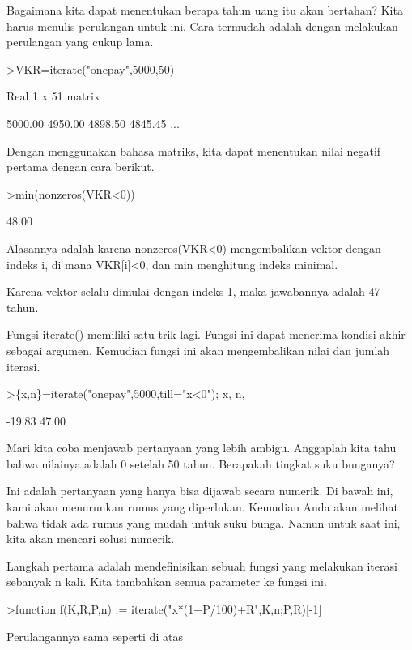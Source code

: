 \documentclass{article}
\begin{document}
\begin{eulernotebook}
\begin{eulercomment}
\begin{eulercomment}
\begin{eulercomment}
Bagaimana kita dapat menentukan berapa tahun uang itu akan bertahan?
Kita harus menulis perulangan untuk ini. Cara termudah adalah dengan
melakukan perulangan yang cukup lama.
\end{eulercomment}
\begin{eulerprompt}
>VKR=iterate("onepay",5000,50)
\end{eulerprompt}
\begin{euleroutput}
  Real 1 x 51 matrix
  
      5000.00     4950.00     4898.50     4845.45     ...
\end{euleroutput}
\begin{eulercomment}
Dengan menggunakan bahasa matriks, kita dapat menentukan nilai negatif
pertama dengan cara berikut.
\end{eulercomment}
\begin{eulerprompt}
>min(nonzeros(VKR<0))
\end{eulerprompt}
\begin{euleroutput}
        48.00 
\end{euleroutput}
\begin{eulercomment}
Alasannya adalah karena nonzeros(VKR\textless{}0) mengembalikan vektor dengan
indeks i, di mana VKR[i]\textless{}0, dan min menghitung indeks minimal.


Karena vektor selalu dimulai dengan indeks 1, maka jawabannya adalah
47 tahun.


Fungsi iterate() memiliki satu trik lagi. Fungsi ini dapat menerima
kondisi akhir sebagai argumen. Kemudian fungsi ini akan mengembalikan
nilai dan jumlah iterasi.
\end{eulercomment}
\begin{eulerprompt}
>\{x,n\}=iterate("onepay",5000,till="x<0"); x, n,
\end{eulerprompt}
\begin{euleroutput}
       -19.83 
        47.00 
\end{euleroutput}
\begin{eulercomment}
Mari kita coba menjawab pertanyaan yang lebih ambigu. Anggaplah kita
tahu bahwa nilainya adalah 0 setelah 50 tahun. Berapakah tingkat suku
bunganya?


Ini adalah pertanyaan yang hanya bisa dijawab secara numerik. Di bawah
ini, kami akan menurunkan rumus yang diperlukan. Kemudian Anda akan
melihat bahwa tidak ada rumus yang mudah untuk suku bunga. Namun untuk
saat ini, kita akan mencari solusi numerik.


Langkah pertama adalah mendefinisikan sebuah fungsi yang melakukan
iterasi sebanyak n kali. Kita tambahkan semua parameter ke fungsi ini.
\end{eulercomment}
\begin{eulerprompt}
>function f(K,R,P,n) := iterate("x*(1+P/100)+R",K,n;P,R)[-1]
\end{eulerprompt}
\begin{eulercomment}
Perulangannya sama seperti di atas



\end{eulercomment}
\end{eulercomment}
\end{eulercomment}
\end{eulernotebook}
\end{document}
